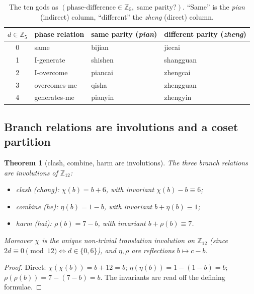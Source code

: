 \documentclass[11pt,a4paper]{article}
\newtheorem{theorem}{Theorem}[section]
\theoremstyle{definition}
\theoremstyle{remark}
\newcommand{\Z}{\mathbb{Z}}
\begin{document}
\begin{table}[h]\centering
\caption{The ten gods as $(\text{phase-difference}\in\Z_5,\;\text{same parity?})$. ``Same'' is the \emph{pian} (indirect) column, ``different'' the \emph{zheng} (direct) column.\label{tab:tengod}}
\small
\begin{tabular}{c l l l}
\toprule
$d\in\Z_5$ & phase relation & same parity (\emph{pian}) & different parity (\emph{zheng})\\
\midrule
0 & same & bijian & jiecai\\
1 & I-generate & shishen & shangguan\\
2 & I-overcome & piancai & zhengcai\\
3 & overcomes-me & qisha & zhengguan\\
4 & generates-me & pianyin & zhengyin\\
\bottomrule
\end{tabular}
\end{table}

\subsection{Branch relations are involutions and a coset partition}

\begin{theorem}[clash, combine, harm are involutions]\label{thm:involutions}
The three branch relations are involutions of $\Z_{12}$:
\begin{itemize}[leftmargin=*]
  \item \emph{clash} (\emph{chong}): $\chi(b)=b+6$, with invariant $\chi(b)-b\equiv6$;
  \item \emph{combine} (\emph{he}): $\eta(b)=1-b$, with invariant $b+\eta(b)\equiv1$;
  \item \emph{harm} (\emph{hai}): $\rho(b)=7-b$, with invariant $b+\rho(b)\equiv7$.
\end{itemize}
Moreover $\chi$ is the unique non-trivial translation involution on $\Z_{12}$ (since $2d\equiv0\pmod{12}\iff d\in\{0,6\}$), and $\eta,\rho$ are reflections $b\mapsto c-b$.
\end{theorem}
\begin{proof}
Direct: $\chi(\chi(b))=b+12=b$; $\eta(\eta(b))=1-(1-b)=b$; $\rho(\rho(b))=7-(7-b)=b$. The invariants are read off the defining formulae.
\end{proof}
\end{document}
